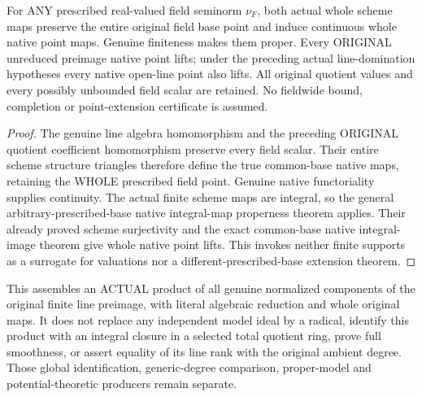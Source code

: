 \begin{theorem}
\label{scheme:whole-normalized-product-native-lifts}
\leanok
{}
For ANY prescribed real-valued field seminorm $\nu_F$, both actual
whole scheme maps preserve the entire original field base point and
induce continuous whole native point maps. Genuine finiteness makes
them proper. Every ORIGINAL unreduced preimage native point lifts;
under the preceding actual line-domination hypotheses every native
open-line point also lifts. All original quotient values and every
possibly unbounded field scalar are retained. No fieldwide bound,
completion or point-extension certificate is assumed.
\end{theorem}
\begin{proof}
The genuine line algebra homomorphism and the preceding ORIGINAL
quotient coefficient homomorphism preserve every field scalar. Their
entire scheme structure triangles therefore define the true common-base
native maps, retaining the WHOLE prescribed field point. Genuine native
functoriality supplies continuity. The actual finite scheme maps are
integral, so the general arbitrary-prescribed-base native integral-map
properness theorem applies. Their already proved scheme surjectivity
and the exact common-base native integral-image theorem give whole
native point lifts. This invokes neither finite supports as a surrogate
for valuations nor a different-prescribed-base extension theorem.
\end{proof}

This assembles an ACTUAL product of all genuine normalized components
of the original finite line preimage, with literal algebraic reduction
and whole original maps. It does not replace any independent model ideal
by a radical, identify this product with an integral closure in a selected
total quotient ring, prove full smoothness, or assert equality of its
line rank with the original ambient degree. Those global identification,
generic-degree comparison, proper-model and potential-theoretic producers
remain separate.
